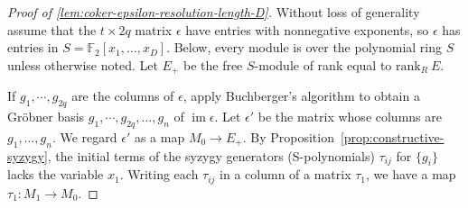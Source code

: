 \documentclass[letterpaper,12pt]{amsart}
\theoremstyle{definition} \newtheorem{defn}{Definition}
\theoremstyle{definition} \newtheorem{rem}{Remark}
\theoremstyle{definition} \newtheorem{example}{Example}
\newcommand{\im}{\mathop{\mathrm{im}}}
\newcommand{\FF}{\mathbb{F}}
\begin{document}
\begin{proof}[Proof of \ref{lem:coker-epsilon-resolution-length-D}]
Without loss of generality
assume that the $t \times 2q$ matrix $\epsilon$ have entries with nonnegative exponents,
so $\epsilon$ has entries in $S=\FF_2[x_1,\ldots,x_D]$.
Below, every module is over the polynomial ring $S$ unless otherwise noted.
Let $E_+$ be the free $S$-module of rank equal to $\mathrm{rank}_R~ E$.

If $g_1,\cdots, g_{2q}$ are the columns of $\epsilon$,
apply Buchberger's algorithm to obtain a Gr\"obner basis
$g_1,\cdots, g_{2q}, \ldots, g_n$ of $\im \epsilon$.
Let $\epsilon'$ be the matrix whose columns are $g_1,\ldots, g_n$.
We regard $\epsilon'$ as a map $M_0 \to E_+$.
By Proposition~\ref{prop:constructive-syzygy},
the initial terms of the syzygy generators (S-polynomials) 
$\tau_{ij}$ for $\{ g_i \}$ lacks the variable $x_1$.
Writing each $\tau_{ij}$ in a column of a matrix $\tau_1$, we have a map $\tau_1 : M_1 \to M_0$.


\end{proof}
\end{document}
